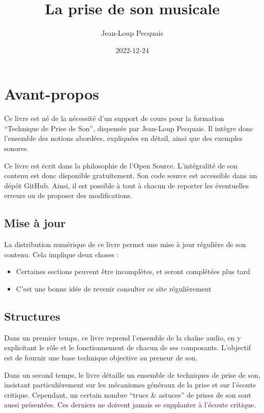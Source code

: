 \documentclass[
]{book}
\title{La prise de son musicale}
\author{Jean-Loup Pecquais}
\date{2022-12-24}
\providecommand{\tightlist}{%
  \setlength{\itemsep}{0pt}\setlength{\parskip}{0pt}}
\begin{document}
\maketitle

{
\setcounter{tocdepth}{1}
\tableofcontents
}
\hypertarget{avant-propos}{%
\chapter{Avant-propos}\label{avant-propos}}

Ce livre est né de la nécessité d'un support de cours pour la formation ``Technique de Prise de Son'', dispensée par Jean-Loup Pecquais. Il intègre donc l'ensemble des notions abordées, expliquées en détail, ainsi que des exemples sonores.

Ce livre est écrit dans la philosophie de l'Open Source. L'intégralité de son contenu est donc disponible gratuitement. Son code source est accessible dans un dépôt GitHub. Ainsi, il est possible à tout à chacun de reporter les éventuelles erreurs ou de proposer des modifications.

\hypertarget{mise-uxe0-jour}{%
\section{Mise à jour}\label{mise-uxe0-jour}}

La distribution numérique de ce livre permet une mise à jour régulière de son contenu. Cela implique deux choses :

\begin{itemize}
\tightlist
\item
  Certaines sections peuvent être incomplètes, et seront complétées plus tard
\item
  C'est une bonne idée de revenir consulter ce site régulièrement
\end{itemize}

\hypertarget{structures}{%
\section{Structures}\label{structures}}

Dans un premier temps, ce livre reprend l'ensemble de la chaîne audio, en y explicitant le rôle et le fonctionnement de chacun de ses composants. L'objectif est de fournir une base technique objective au preneur de son.

Dans un second temps, le livre détaille un ensemble de techniques de prise de son, insistant particulièrement sur les mécanismes généraux de la prise et sur l'écoute critique. Cependant, un certain nombre ``trucs \& astuces'' de prises de son sont aussi présentées. Ces derniers ne doivent jamais se supplanter à l'écoute critique.
\end{document}
